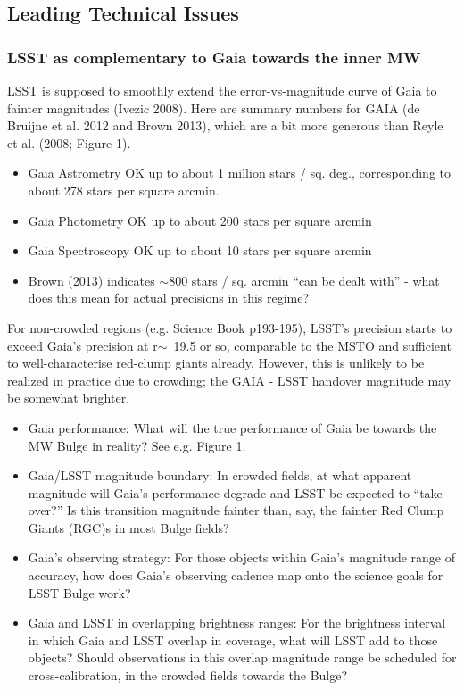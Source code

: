 \subsection{Leading Technical Issues}

\subsubsection{LSST as complementary to Gaia towards the inner MW}
LSST is supposed to smoothly extend the error-vs-magnitude curve of Gaia to fainter magnitudes (Ivezic 2008). Here are summary numbers for GAIA (de Bruijne et al. 2012 and Brown 2013), which are a bit more generous than Reyle et al. (2008; Figure 1). 
\begin{itemize}
\item Gaia Astrometry OK up to about 1 million stars / sq. deg., corresponding to about 278 stars per square arcmin. 
\item Gaia Photometry OK up to about 200 stars per square arcmin 
\item Gaia Spectroscopy OK up to about 10 stars per square arcmin 
\item Brown (2013) indicates $\sim$800 stars / sq. arcmin “can be dealt with” - what does this mean for actual 
precisions in this regime? 
\end{itemize}

For non-crowded regions (e.g. Science Book p193-195), LSST’s precision starts to exceed Gaia’s 
precision at r$\sim$~19.5 or so, comparable to the MSTO and sufficient to well-characterise 
red-clump giants already. 
However, this is unlikely to be realized in 
practice due to crowding; the GAIA - LSST handover magnitude may be somewhat brighter. 
\begin{itemize}

\item Gaia performance: What will the true performance of Gaia be towards the MW Bulge in reality? See e.g. Figure 1. 
\item Gaia/LSST magnitude boundary: In crowded fields, at what apparent magnitude will Gaia’s performance degrade and LSST be expected to “take over?” Is this transition magnitude fainter than, say, the fainter Red Clump Giants (RGC)s in most Bulge fields? 
\item Gaia’s observing strategy: For those objects within Gaia’s magnitude range of accuracy, how does Gaia’s observing cadence map onto the science goals for LSST Bulge work? 
\item Gaia and LSST in overlapping brightness ranges: For the brightness interval in which Gaia and LSST overlap in coverage, what will LSST add to those objects? Should observations in this overlap magnitude range be scheduled for cross-calibration, in the crowded fields towards the Bulge? 
\end{itemize}

